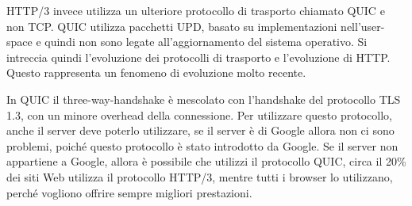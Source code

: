 \documentclass{article}
\numberwithin{equation}{subsection}
\begin{document}

HTTP/3 invece utilizza un ulteriore protocollo di trasporto chiamato QUIC e non TCP. QUIC utilizza pacchetti UPD, basato su implementazioni nell'user-space e quindi 
non sono legate all'aggiornamento del sistema operativo. 
Si intreccia quindi l'evoluzione dei protocolli di trasporto e l'evoluzione di HTTP. 
Questo rappresenta un fenomeno di evoluzione molto recente. 

In QUIC il three-way-handshake è mescolato con l'handshake del protocollo TLS 1.3, con un minore overhead della connessione. Per utilizzare questo protocollo, 
anche il server deve poterlo utilizzare, se il server è di Google allora non ci sono problemi, poiché questo protocollo è stato introdotto da Google. Se il 
server non appartiene a Google, allora è possibile che utilizzi il protocollo QUIC, circa il 20\% dei siti Web utilizza il protocollo HTTP/3, mentre tutti i 
browser lo utilizzano, perché vogliono offrire sempre migliori prestazioni. 
\end{document}
